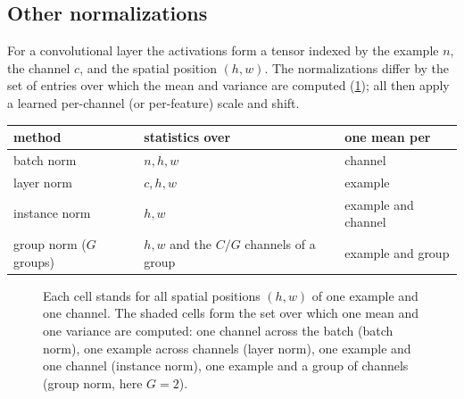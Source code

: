 \begin{notechapter}
\section{Other normalizations}\label{normalization:sec:others}

For a convolutional layer the activations form a tensor indexed by the example $n$, the
channel $c$, and the spatial position $(h, w)$. The normalizations differ by the set of entries
over which the mean and variance are computed (\cref{normalization:fig:axes}); all then
apply a learned per-channel (or per-feature) scale and shift.

\begin{center}
\begin{tabular}{lll}
\toprule
method & statistics over & one mean per \\
\midrule
batch norm & $n, h, w$ & channel \\
layer norm & $c, h, w$ & example \\
instance norm & $h, w$ & example and channel \\
group norm ($G$ groups) & $h, w$ and the $C/G$ channels of a group & example and group \\
\bottomrule
\end{tabular}
\end{center}

\begin{figure}[ht]
\centering
{}
\caption{Each cell stands for all spatial positions $(h,w)$ of one example and one channel.
The shaded cells form the set over which one mean and one variance are computed: one
channel across the batch (batch norm), one example across channels (layer norm), one
example and one channel (instance norm), one example and a group of channels (group
norm, here $G = 2$).}
\label{normalization:fig:axes}
\end{figure}


\end{notechapter}
